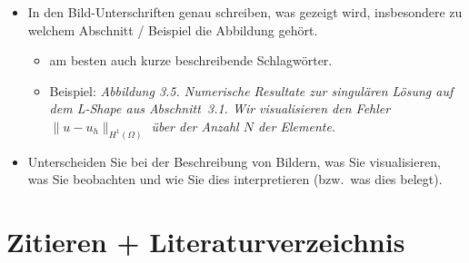 {\color{change}
\begin{itemize}
\item In den Bild-Unterschriften genau schreiben, was gezeigt wird, insbesondere zu welchem Abschnitt / Beispiel die Abbildung gehört.
\begin{itemize}
\item am besten auch kurze beschreibende Schlagwörter.
\item Beispiel: \emph{Abbildung 3.5. Numerische Resultate zur singulären Lösung auf dem L-Shape aus  Abschnitt~3.1. Wir visualisieren den Fehler $\|u-u_h\|_{H^1(\Omega)}$ über der Anzahl $N$ der Elemente.}
\end{itemize}

\item Unterscheiden Sie bei der Beschreibung von Bildern, was Sie visualisieren, was Sie beobachten und wie Sie dies interpretieren (bzw.\ was dies belegt).

\end{itemize}
}

\section{Zitieren + Literaturverzeichnis}

